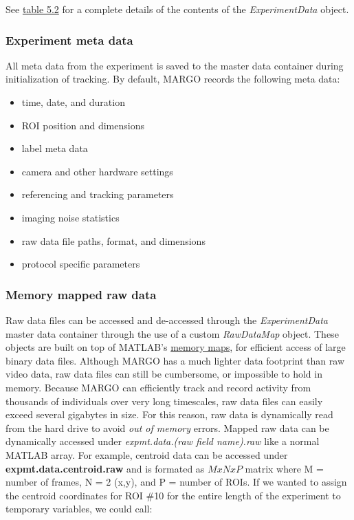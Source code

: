 \documentclass[11pt]{article}
\begin{document}
See \hyperlink{expmttable}{table 5.2} for a complete details of the contents of the \textit{ExperimentData} object.

\subsubsection{Experiment meta data}

All meta data from the experiment is saved to the master data container during initialization of tracking. By default, MARGO records the following meta data:


\begin{multicols}{2}
	\begin{itemize}
		\itemsep0em
		\item time, date, and duration
		\item ROI position and dimensions
		\item label meta data
		\item camera and other hardware settings
		\item referencing and tracking parameters
		\item imaging noise statistics
		\item raw data file paths, format, and dimensions
		\item protocol specific parameters
	\end{itemize}
\end{multicols}


\subsubsection{Memory mapped raw data}

Raw data files can be accessed and de-accessed through the \textit{ExperimentData} master data container through the use of a custom \textit{RawDataMap} object. These objects are built on top of MATLAB's \href{https://www.mathworks.com/help/matlab/ref/memmapfile.html}{memory maps}, for efficient access of large binary data files. Although MARGO has a much lighter data footprint than raw video data, raw data files can still be cumbersome, or impossible to hold in memory. Because MARGO can efficiently track and record activity from thousands of individuals over very long timescales, raw data files can easily exceed several gigabytes in size. For this reason, raw data is dynamically read from the hard drive to avoid \textit{out of memory} errors. Mapped raw data can be dynamically accessed under \textit{expmt.data.(raw field name).raw} like a normal MATLAB array. For example, centroid data can be accessed under \textbf{expmt.data.centroid.raw} and is formated as $ M x N x P$ matrix where M = number of frames, N = 2 (x,y), and P = number of ROIs. If we wanted to assign the centroid coordinates for ROI \#10 for the entire length of the experiment to temporary variables, we could call:
\end{document}
